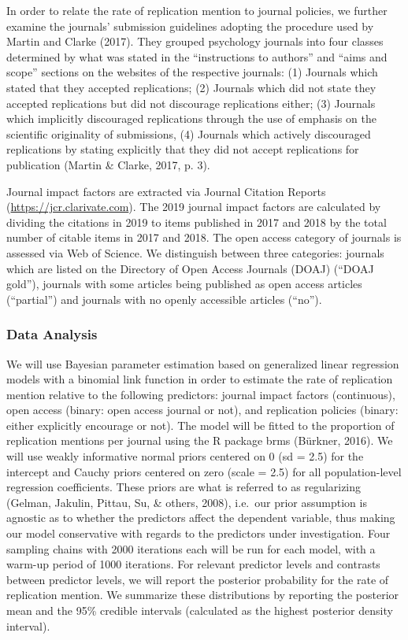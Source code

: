 \documentclass[
  english,
  man]{apa6}
\begin{document}
In order to relate the rate of replication mention to journal policies, we further examine the journals' submission guidelines adopting the procedure used by Martin and Clarke (2017).
They grouped psychology journals into four classes determined by what was stated in the \enquote{instructions to authors} and \enquote{aims and scope} sections on the websites of the respective journals:
(1) Journals which stated that they accepted replications;
(2) Journals which did not state they accepted replications but did not discourage replications either;
(3) Journals which implicitly discouraged replications through the use of emphasis on the scientific originality of submissions,
(4) Journals which actively discouraged replications by stating explicitly that they did not accept replications for publication (Martin \& Clarke, 2017, p. 3).

Journal impact factors are extracted via Journal Citation Reports (\url{https://jcr.clarivate.com}).
The 2019 journal impact factors are calculated by dividing the citations in 2019 to items published in 2017 and 2018 by the total number of citable items in 2017 and 2018.
The open access category of journals is assessed via Web of Science.
We distinguish between three categories: journals which are listed on the Directory of Open Access Journals (DOAJ) (\enquote{DOAJ gold}), journals with some articles being published as open access articles (\enquote{partial}) and journals with no openly accessible articles (\enquote{no}).

\hypertarget{data-analysis}{%
\subsubsection{Data Analysis}\label{data-analysis}}

We will use Bayesian parameter estimation based on generalized linear regression models with a binomial link function in order to estimate the rate of replication mention relative to the following predictors: journal impact factors (continuous), open access (binary: open access journal or not), and replication policies (binary: either explicitly encourage or not).
The model will be fitted to the proportion of replication mentions per journal using the R package brms (Bürkner, 2016).
We will use weakly informative normal priors centered on 0 (sd = 2.5) for the intercept and Cauchy priors centered on zero (scale = 2.5) for all population-level regression coefficients.
These priors are what is referred to as regularizing (Gelman, Jakulin, Pittau, Su, \& others, 2008), i.e.~our prior assumption is agnostic as to whether the predictors affect the dependent variable, thus making our model conservative with regards to the predictors under investigation.
Four sampling chains with 2000 iterations each will be run for each model, with a warm-up period of 1000 iterations.
For relevant predictor levels and contrasts between predictor levels, we will report the posterior probability for the rate of replication mention.
We summarize these distributions by reporting the posterior mean and the 95\% credible intervals (calculated as the highest posterior density interval).
\end{document}
